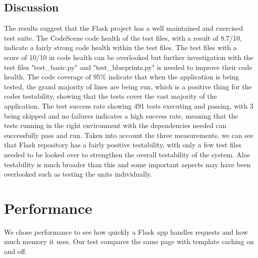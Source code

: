 \documentclass[12pt,a4paper]{article}
\begin{document}
\subsection{Discussion}
The results suggest that the Flask project has a well maintained and exercised test suite. The CodeScene code health of the test files, with a result of 8.7/10, indicate a fairly strong code health within the test files. The test files with a score of 10/10 in code health can be overlooked but further investigation with the test files "test\_basic.py" and "test\_blueprints.py" is needed to improve their code health. \newline
The code coverage of 95\% indicate that when the application is being tested, the grand majority of lines are being run, which is a positive thing for the codes testability, showing that the tests cover the vast majority of the application.\newline
The test success rate showing 491 tests executing and passing, with 3 being skipped and no failures indicates a high success rate, meaning that the tests running in the right environment with the dependencies needed can successfully pass and run.\newline
Taken into account the three measurements, we can see that Flask repository has a fairly positive testability, with only a few test files needed to be looked over to strengthen the overall testability of the system. Alas testability is much broader than this and some important aspects may have been overlooked such as testing the units individually. 




\section{Performance}
\label{sec:performance}
We chose performance to see how quickly a Flask app handles requests and how much memory it uses. Our test compares the same page with template caching on and off.
\end{document}
